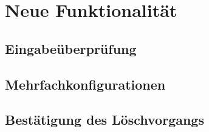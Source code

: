 \section{Neue Funktionalität}

\subsection{Eingabeüberprüfung}

\subsection{Mehrfachkonfigurationen}

\subsection{Bestätigung des Löschvorgangs}